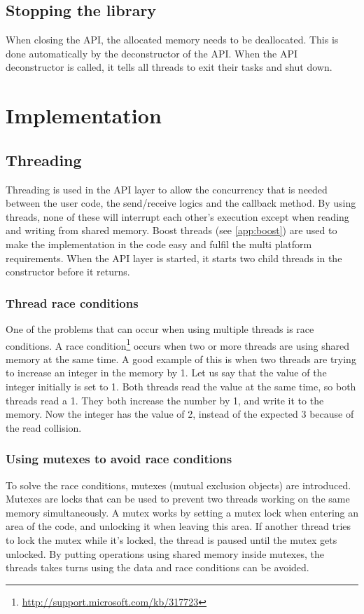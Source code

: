 \subsection{Stopping the library}
When closing the API, the allocated memory needs to be deallocated. This is done automatically by the deconstructor of the API. When the API deconstructor is called, it tells all threads to exit their tasks and shut down.

\section{Implementation}
\subsection{Threading}
\label{threading}
Threading is used in the API layer to allow the concurrency that is needed between the user code, the send/receive logics and the callback method. By using threads, none of these will interrupt each other's execution except when reading and writing from shared memory. Boost threads (see \ref{app:boost}) are used to make the implementation in the code easy and fulfil the multi platform requirements. When the API layer is started, it starts two child threads in the constructor before it returns.

\subsubsection{Thread race conditions}
\label{thread_race_conditions}
One of the problems that can occur when using multiple threads is race conditions. A race condition\footnote{\url{http://support.microsoft.com/kb/317723}} occurs when two or more threads are using shared memory at the same time. A good example of this is when two threads are trying to increase an integer in the memory by 1. Let us say that the value of the integer initially is set to 1. Both threads read the value at the same time, so both threads read a 1. They both increase the number by 1, and write it to the memory. Now the integer has the value of 2, instead of the expected 3 because of the read collision.

\subsubsection{Using mutexes to avoid race conditions}
\label{mutex}
To solve the race conditions, mutexes (mutual exclusion objects) are introduced. Mutexes are locks that can be used to prevent two threads working on the same memory simultaneously. A mutex works by setting a mutex lock when entering an area of the code, and unlocking it when leaving this area. If another thread tries to lock the mutex while it's locked, the thread is paused until the mutex gets unlocked. By putting operations using shared memory inside mutexes, the threads takes turns using the data and race conditions can be avoided.

